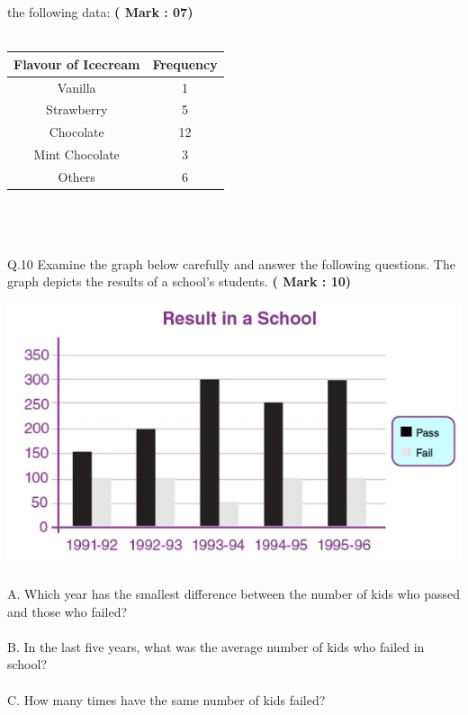 \documentclass[10pt]{article}
\begin{document}
the following data: \tab \hspace{42ex}\textbf{( Mark : 07)}\\
  \\   \begin{tabular}{|c|c|}
    \hline
        Flavour of Icecream & Frequency \\
    \hline
        Vanilla & 1\\
    \hline
        Strawberry & 5 \\
    \hline
        Chocolate & 12 \\
    \hline
        Mint Chocolate & 3 \\
    \hline
        Others & 6 \\
    \hline
    \end{tabular}  \\
\\ \\
Q.10 Examine the graph below carefully and answer the following questions. The graph depicts the results of a school’s students. \tab \hspace{42ex}\textbf{( Mark : 10)}

\includegraphics[width=0.85\linewidth]{q10.jpg} \\
%
\\
\hspace*{4ex}A. Which year has the smallest difference between the number of kids who passed and those who failed? \\ \\
\hspace*{4ex}B. In the last five years, what was the average number of kids who failed in school? \\ \\
\hspace*{4ex}C. How many times have the same number of kids failed? \\ \\
\end{document}
